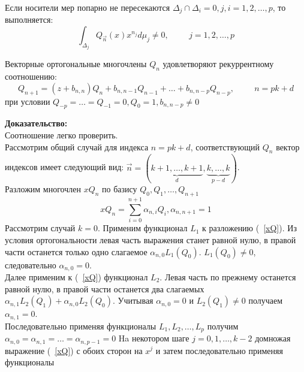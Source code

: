 \begin{prope} Если носители мер попарно не пересекаются
$\Delta_j\cap\Delta_i=0, j,i=1,2,\ldots,p$, то выполняется:
\begin{equation}
\label{Ortogonality} \int_{\Delta_j}{Q_{\overrightarrow{n}}(x)}
x^{n_j}d\mu_j \not=0, \hspace{1cm}j=1,2,\ldots,p
\end{equation}
\end{prope}
\begin{prope}
Векторные ортогональные многочлены $Q_n$ удовлетворяют
рекуррентному соотношению:
\begin{equation}
\label{QRecurrrence}
Q_{n+1}=(z+b_{n,n})Q_n+b_{n,n-1}Q_{n-1}+\ldots+b_{n,n-p}Q_{n-p},
\hspace{1cm} n=pk+d
\end{equation}
при условии $Q_{-p}=\ldots=Q_{-1}=0,Q_0=1, b_{n,n-p}\not=0$ \\
\end{prope}
\textbf{Доказательство:} \\
Соотношение легко проверить. \\ Рассмотрим общий случай для
индекса $n=pk+d$, соответствующий $Q_n$ вектор индексов имеет
следующий вид:
$\overrightarrow{n}=(\underbrace{k+1,\ldots,k+1}_{d},\underbrace{k,\ldots,k}_{p-d})$.
\\ Разложим многочлен $xQ_n$ по базису $Q_0,Q_1,\ldots,Q_{n+1}$
\begin{equation}
\label{xQ}
xQ_n=\sum\limits_{i=0}^{n+1}{\alpha_{n,i}Q_i},\mbox{
}\alpha_{n,n+1}=1
\end{equation}
Рассмотрим случай $k=0$. Применим функционал $L_1$ к разложению
(~\ref{xQ}). Из условия ортогональности левая часть выражения
станет равной нулю, в правой части останется только одно
слагаемое $\alpha_{n,0}L_1(Q_0)$.
$L_1(Q_0)\not=0$, следовательно $\alpha_{n,0}=0$. \\
Далее применим к (~\ref{xQ}) функционал $L_2$. Левая часть по
прежнему останется равной нулю, в правой части останется два
слагаемых $\alpha_{n,1}L_2(Q_1)+\alpha_{n,0}L_2(Q_0)$.
Учитывая $\alpha_{n,0}=0$ и $L_2(Q_1)\not=0$ получаем $\alpha_{n,1}=0$. \\
Последовательно применяя функционалы $L_1,L_2,\ldots,L_p$ получим
$\alpha_{n,0}=\alpha_{n,1}=\ldots=\alpha_{n,p-1}=0$ Ha некотором
шаге $j=0,1,\ldots,k-2$ домножая выражение (~\ref{xQ}) с обоих
сторон на $x^j$ и затем последовательно применяя функционалы
